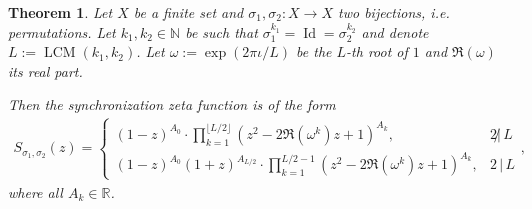 \documentclass[10pt,a4paper]{amsart}
\theoremstyle{plain}
\newtheorem{thm}{Theorem}
\theoremstyle{definition}
\theoremstyle{remark}
\def\N{\mathbb{N}}
\def\R{\mathbb{R}}
\def\Id{\operatorname{Id}}
\def\LCM{\operatorname{LCM}}
\begin{document}
\begin{thm} \label{thm:synchronization-zeta-form-bijections-finite}
  Let $X$ be a finite set and $\sigma_1, \sigma_2: X \to X$ two bijections, i.e. permutations.
  Let $k_1, k_2 \in \N$ be such that $\sigma_1^{k_1} = \Id = \sigma_2^{k_2}$
  and denote $L := \LCM(k_1,k_2)$.
  Let $\omega := \exp(2\pi\iota/L)$ be the $L$-th root of $1$ and $\Re(\omega)$ its real part.

  Then the synchronization zeta function is of the form
  \begin{align} \label{eq:synchronization-permutations}
    S_{\sigma_1,\sigma_2}(z) = \begin{cases}
      (1-z)^{A_0} \cdot \prod_{k=1}^{\lfloor L/2 \rfloor} \left( z^2 - 2\Re(\omega^k)z+1 \right)^{A_k}, & 2 \!\not|\, L \\[1ex]
      (1-z)^{A_0}(1+z)^{A_{L/2}} \cdot \prod_{k=1}^{L/2-1} \left( z^2 - 2\Re(\omega^k)z+1 \right)^{A_k}, & 2 \,\vert\, L
    \end{cases},
  \end{align}
  where all $A_k \in \R$.
\end{thm}
\end{document}
